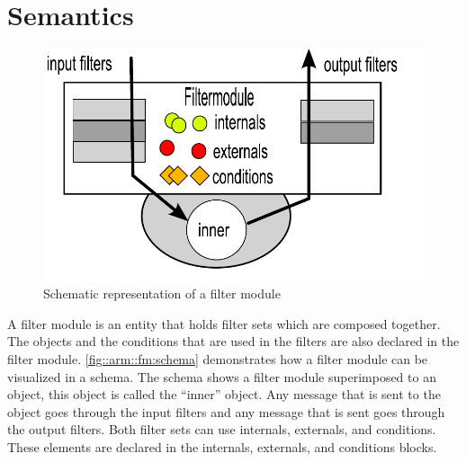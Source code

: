\section{Semantics}
\begin{figure}[tpb]
	\centering
	\includegraphics[style= fourthheight]{images/ARM-filtermodule}
	\caption{Schematic representation of a filter module}
	\label{fig::arm::fm:schema}
\end{figure}
A filter module is an entity that holds filter sets which are composed together.
The objects and the conditions that are used in the filters are also declared in the filter module.
\autoref{fig::arm::fm:schema} demonstrates how a filter module can be visualized in a schema.
The schema shows a filter module superimposed to an object, this object is called the ``inner'' object.
Any message that is sent to the object goes through the input filters and any message that is sent goes through the output filters. 
Both filter sets can use internals, externals, and conditions.
These elements are declared in the internals, externals, and conditions blocks.

